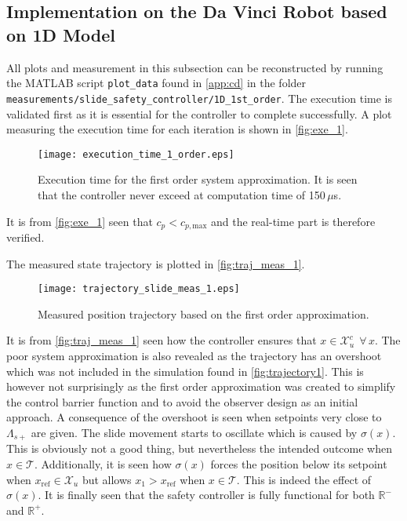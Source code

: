 \subsection{Implementation on the Da Vinci Robot based on 1D Model}\label{subsec:implement-davinci-1d}
All plots and measurement in this subsection can be reconstructed by running the MATLAB script \texttt{plot\_data} found in \autoref{app:cd} in the folder \texttt{measurements/slide\_safety\_controller/1D\_1st\_order}. The execution time is validated first as it is essential for the controller to complete successfully. A plot measuring the execution time for each iteration is shown in \autoref{fig:exe_1}.
\begin{figure}[H]
	\center
		\texttt{[image: execution\_time\_1\_order.eps]}
	\caption{Execution time for the first order system approximation. It is seen that the controller never exceed at computation time of 150\,$\mu$s.}
	\label{fig:exe_1}
\end{figure}
It is from \autoref{fig:exe_1} seen that $c_p < c_{p,\text{max}}$ and the real-time part is therefore verified.

The measured state trajectory is plotted in \autoref{fig:traj_meas_1}.
\begin{figure}[H]
	\center
		\texttt{[image: trajectory\_slide\_meas\_1.eps]}
	\caption{Measured position trajectory based on the first order approximation.}
    \label{fig:traj_meas_1}
\end{figure}
It is from \autoref{fig:traj_meas_1} seen how the controller ensures that $x \in \mathcal{X}_u^c \ \ \forall \, x$. The poor system approximation is also revealed as the trajectory has an overshoot which was not included in the simulation found in \autoref{fig:trajectory1}. This is however not surprisingly as the first order approximation was created to simplify the control barrier function and to avoid the observer design as an initial approach. A consequence of the overshoot is seen when setpoints very close to $\Lambda_{s+}$ are given. The slide movement starts to oscillate which is caused by $\sigma(x)$. This is obviously not a good thing, but nevertheless the intended outcome when $x \in \mathcal{T}$. Additionally, it is seen how $\sigma(x)$ forces the position below its setpoint when $x_\text{ref} \in \mathcal{X}_u$ but allows $x_1 > x_\text{ref}$ when $x \in \mathcal{T}$. This is indeed the effect of $\sigma(x)$. It is finally seen that the safety controller is fully functional for both $\mathbb{R}^-$ and $\mathbb{R}^+$.

